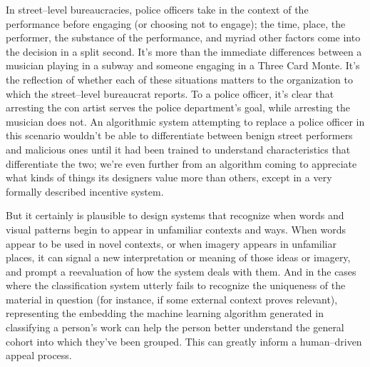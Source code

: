 \documentclass[main]{subfiles}
\begin{document}

In street--level bureaucracies, police officers take in the context of the performance before engaging (or choosing not to engage);
the time, place, the performer, the substance of the performance, and myriad other factors come into the decision in a split second.
It's more than the immediate differences between a musician playing in a subway and someone engaging in a Three Card Monte.
It's the reflection of whether each of these situations matters to the organization to which the street--level bureaucrat reports.
To a police officer,
it's clear that arresting the con artist serves the police department's goal, while
arresting the musician does not.
An algorithmic system attempting to replace a police officer in this scenario wouldn't be able to differentiate between benign street performers and malicious ones until it had been trained to understand characteristics that differentiate the two;
we're even further from an algorithm coming to appreciate what kinds of things its designers value more than others, except in a very formally described incentive system.



But it certainly is plausible to design systems that recognize when words and visual patterns begin to appear in unfamiliar contexts and ways.
When words appear to be used in novel contexts, or when imagery appears in unfamiliar places,
it can signal a new interpretation or meaning of those ideas or imagery, and prompt a reevaluation of how the system deals with them.\footnotemark{}
And in the cases where the classification system utterly fails to recognize the uniqueness of the material in question
(for instance, if some external context proves relevant),
representing the embedding the machine learning algorithm generated in classifying a person's work can help the person better understand the general cohort into which they've been grouped.
This can greatly inform a human--driven appeal process.
\end{document}
